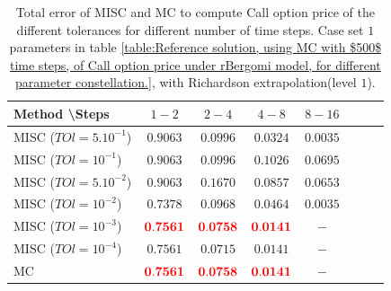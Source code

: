 \documentclass[11pt]{article}
\begin{document}
\begin{table}[!h]
	\centering
	\begin{tabular}{l*{6}{c}r}
		Method \textbackslash  Steps            & $1-2$ & $2-4$ & $4-8$ & $8-16$  \\
		\hline
		MISC ($TOl=5.10^{-1}$)  & $\mathbf{0.9063
		}$ & $\mathbf{ 0.0996}$ & $\mathbf{0.0324
		}$ & $\mathbf{ 0.0035}$ \\
		MISC ($TOl=10^{-1}$)  & $\mathbf{0.9063
		}$ & $\mathbf{ 0.0996}$ & $\mathbf{  0.1026}$ & $\mathbf{ 0.0695
		}$  \\
		MISC ($TOl=5.10^{-2}$)  & $\mathbf{0.9063
		}$ & $\mathbf{    0.1670}$ & $\mathbf{ 0.0857}$ & $\mathbf{0.0653
		}$  \\
		MISC ($TOl=10^{-2}$)  & $\mathbf{0.7378}$ & $\mathbf{  0.0968}$ & $\mathbf{   0.0464}$ & $\mathbf{ 0.0035}$  \\	
		MISC ($TOl=10^{-3}$)  & $\mathbf{{\color{red}0.7561}}$ & $\mathbf{{\color{red}0.0758}}$ & $\mathbf{{\color{red}0.0141}}$ & $\mathbf{-}$  \\
		MISC ($TOl=10^{-4}$)  & $\mathbf{0.7561}$ & $\mathbf{0.0715}$ & $\mathbf{0.0141}$ & $\mathbf{-}$  \\
		\hline
			MC   & $\mathbf{{\color{red}0.7561}}$  & $\mathbf{{\color{red}0.0758}}$  & $\mathbf{{\color{red}0.0141}}$ &$\mathbf{-}$   \\
		\hline
	\end{tabular}
	\caption{Total  error of MISC and MC to compute Call option price of the different tolerances for different number of time steps. Case set $1$ parameters in table \ref{table:Reference solution, using MC with $500$ time steps, of Call option price under rBergomi model, for different parameter constellation.}, with Richardson extrapolation(level $1$).}
	\label{Total  error of MISC and MC to compute Call option price of the different tolerances for different number of time steps. Case set $1$ parameters, with Richardson extrapolation(level $1$). The numbers between parentheses are the corresponding absolute errors.}
\end{table}
\end{document}
